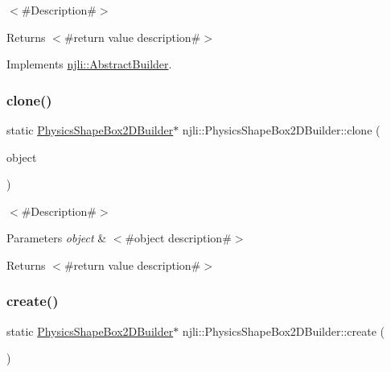 $<$\#\+Description\#$>$

\begin{DoxyReturn}{Returns}
$<$\#return value description\#$>$ 
\end{DoxyReturn}


Implements \mbox{\hyperlink{classnjli_1_1_abstract_builder_aa1d220053e182c37b31b427499c6eacf}{njli\+::\+Abstract\+Builder}}.

\mbox{\label{classnjli_1_1_physics_shape_box2_d_builder_a61c14aafa279c3c0a6243ec4399903e5}} 
\subsubsection{\texorpdfstring{clone()}{clone()}}
{\footnotesize\ttfamily static \mbox{\hyperlink{classnjli_1_1_physics_shape_box2_d_builder}{Physics\+Shape\+Box2\+D\+Builder}}$\ast$ njli\+::\+Physics\+Shape\+Box2\+D\+Builder\+::clone (\begin{DoxyParamCaption}\item[{const \mbox{\hyperlink{classnjli_1_1_physics_shape_box2_d_builder}{Physics\+Shape\+Box2\+D\+Builder}} \&}]{object }\end{DoxyParamCaption})\hspace{0.3cm}{\ttfamily [static]}}

$<$\#\+Description\#$>$


\begin{DoxyParams}{Parameters}
{\em object} & $<$\#object description\#$>$\\
\hline
\end{DoxyParams}
\begin{DoxyReturn}{Returns}
$<$\#return value description\#$>$ 
\end{DoxyReturn}
\mbox{\label{classnjli_1_1_physics_shape_box2_d_builder_a3273b7ee5aca9f70908bfdfdbb9c8a7c}} 
\subsubsection{\texorpdfstring{create()}{create()}}
{\footnotesize\ttfamily static \mbox{\hyperlink{classnjli_1_1_physics_shape_box2_d_builder}{Physics\+Shape\+Box2\+D\+Builder}}$\ast$ njli\+::\+Physics\+Shape\+Box2\+D\+Builder\+::create (\begin{DoxyParamCaption}{ }\end{DoxyParamCaption})\hspace{0.3cm}{\ttfamily [static]}}

